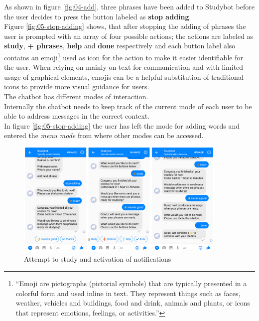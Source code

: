 As shown in figure \ref{fig:04-add}, three phrases have been added to Studybot
before the user decides to press the button labeled as \textbf{stop adding}.
\\
Figure \ref{fig:05-stop-adding} shows, that after stopping the adding of phrases the user is prompted with an array of four possible actions;
the actions are labeled as \textbf{study}, \textbf{+ phrases}, \textbf{help} and \textbf{done} respectively
and each button label also contains an emoji\footnote{``Emoji are pictographs (pictorial symbols) that are typically presented in a colorful form and used inline in text. They represent things such as faces, weather, vehicles and buildings, food and drink, animals and plants, or icons that represent emotions, feelings, or activities.''\cite{emoji}} used as icon for the action to make it easier identifiable for the user.
When relying on mainly on text for communication
and with limited usage of graphical elements, emojis can be a helpful substitution of traditional icons
to provide more visual guidance for users.
\\

The chatbot has different modes of interaction.
\\
Internally the chatbot needs to keep track of the current mode of each user to be able
to address messages in the correct context.
\\
In figure \ref{fig:05-stop-adding} the user has left the mode for adding words
and entered the \emph{menu mode} from where other modes can be accessed.
\\

\begin{figure}[h]
  \centering
  \includegraphics[width=0.9\textwidth]{images/interface/06-enable-notify.png}
	\caption{Attempt to study and activation of notifications}
	\label{fig:06-enable-notify}
\end{figure}

